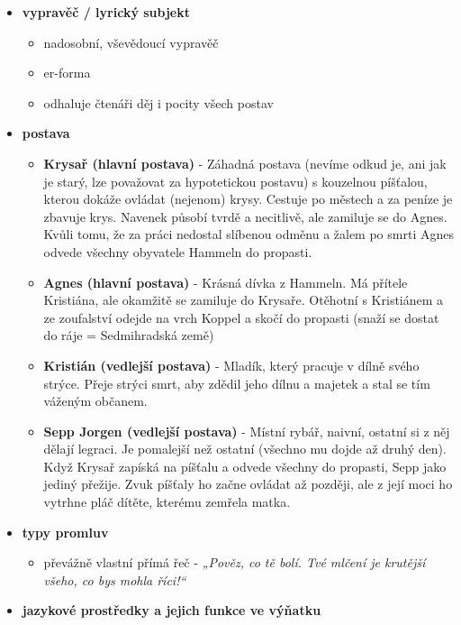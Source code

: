 \documentclass[11pt]{article}
\begin{document}
\begin{itemize}
        \item\textbf{vypravěč / lyrický subjekt}
        \begin{itemize}
            \item nadosobní, vševědoucí vypravěč
            \item er-forma
            \item odhaluje čtenáři děj i pocity všech postav
        \end{itemize}
        \item\textbf{postava}
        \begin{itemize}
            \item\textbf{Krysař (hlavní postava)} - Záhadná postava (nevíme odkud je, ani jak je starý, lze považovat za hypotetickou postavu) s kouzelnou píšťalou, kterou dokáže ovládat (nejenom) krysy. Cestuje po městech a za peníze je zbavuje krys. Navenek působí tvrdě a necitlivě, ale zamiluje se do Agnes. Kvůli tomu, že za práci nedostal slíbenou odměnu a žalem po smrti Agnes odvede všechny obyvatele Hammeln do propasti.
            \item\textbf{Agnes (hlavní postava)} - Krásná dívka z Hammeln. Má přítele Kristiána, ale okamžitě se zamiluje do Krysaře. Otěhotní s Kristiánem a ze zoufalství odejde na vrch Koppel a skočí do propasti (snaží se dostat do ráje = Sedmihradská země)
            \item\textbf{Kristián (vedlejší postava)} - Mladík, který pracuje v dílně svého strýce. Přeje strýci smrt, aby zdědil jeho dílnu a majetek a stal se tím váženým občanem.
            \item\textbf{Sepp Jorgen (vedlejší postava)} - Místní rybář, naivní, ostatní si z něj dělají legraci. Je pomalejší než ostatní (všechno mu dojde až druhý den). Když Krysař zapíská na píšťalu a odvede všechny do propasti, Sepp jako jediný přežije. Zvuk píšťaly ho začne ovládat až později, ale z její moci ho vytrhne pláč dítěte, kterému zemřela matka.
        \end{itemize}
        \item\textbf{typy promluv}
        \begin{itemize}
            \item převážně vlastní přímá řeč - \textit{„Pověz, co tě bolí. Tvé mlčení je krutější všeho, co bys mohla říci!“}
        \end{itemize}
        \item\textbf{jazykové prostředky a jejich funkce ve výňatku}
        \begin{itemize}

\end{itemize}
\end{itemize}
\end{document}
